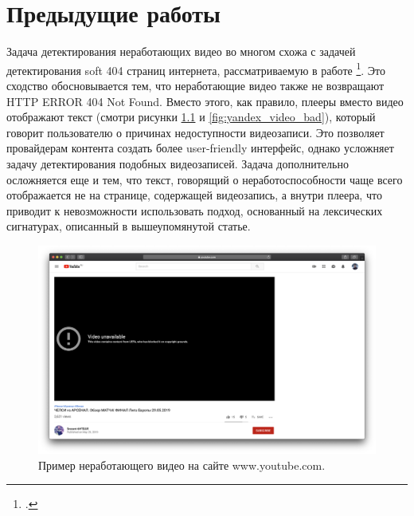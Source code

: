 

\chapter{Предыдущие работы}

Задача детектирования неработающих видео во многом схожа с задачей детектирования soft 404 страниц интернета, рассматриваемую в работе \footcite{Meneses2012}. Это сходство обосновывается тем, что неработающие видео также не возвращают HTTP ERROR 404 Not Found. Вместо этого, как правило, плееры вместо видео отображают текст (смотри рисунки \ref{fig:youtube_bad} и \ref{fig:yandex_video_bad}), который говорит пользователю о причинах недоступности видеозаписи. Это позволяет провайдерам контента создать более user-friendly интерфейс, однако усложняет задачу детектирования подобных видеозаписей. Задача дополнительно осложняется еще и тем, что текст, говорящий о неработоспособности чаще всего отображается не на странице, содержащей видеозапись, а внутри плеера, что приводит к невозможности использовать подход, основанный на лексических сигнатурах, описанный в вышеупомянутой статье.

\begin{figure}
    \centering
    \includegraphics[width=\textwidth]{images/youtube_bad}
    \caption{Пример неработающего видео на сайте www.youtube.com.}
    \label{fig:youtube_bad}
\end{figure}

